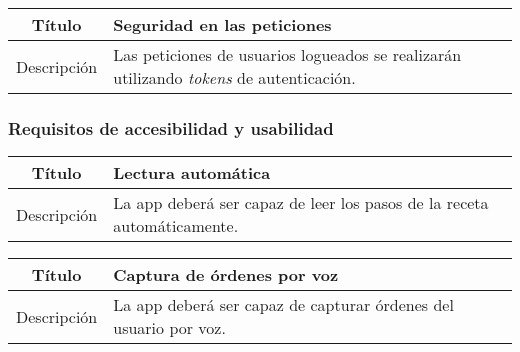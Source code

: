 \begin{center}
  
  \begin{tabularx}{\textwidth}{|c|X|}
    \hline
    Título & Seguridad en las peticiones \\

    \hline

    Descripción & Las peticiones de usuarios logueados se realizarán utilizando
    \textit{tokens} de autenticación.\\


    \hline
  \end{tabularx}
\end{center}


\subsubsection{Requisitos de accesibilidad y usabilidad}

\begin{center}
  
  \begin{tabularx}{\textwidth}{|c|X|}
    \hline
    Título & Lectura automática \\

    \hline

    Descripción & La app deberá ser capaz de leer los pasos de la receta
    automáticamente.\\

    \hline
  \end{tabularx}
  \label{tab:accesibilidad}
\end{center}

\begin{center}
  
  \begin{tabularx}{\textwidth}{|c|X|}
    \hline
    Título & Captura de órdenes por voz \\

    \hline

    Descripción & La app deberá ser capaz de capturar órdenes del usuario por
    voz.\\

    \hline
  \end{tabularx}
  \label{tab:accesibilidad}
\end{center}


